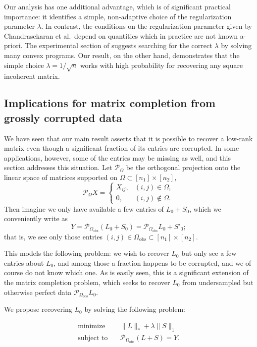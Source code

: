 Our analysis has one additional advantage, which is of significant practical importance: it identifies a simple, non-adaptive choice of the regularization parameter $\lambda$. In contrast, the conditions on the regularization parameter given by Chandrasekaran et al.~depend on quantities which in practice are not known a-priori. The experimental section of \cite{Venkat-09} suggests searching for the correct
$\lambda$ by solving many convex programs. Our result, on the other hand, demonstrates that the simple choice $\lambda = 1/\sqrt{n}$ works with high probability for recovering any square incoherent matrix.

\subsection{Implications for matrix completion from grossly corrupted data}
\label{sec:matrix-completion}

We have seen that our main result asserts that it is possible to recover a low-rank matrix even though a significant fraction of its entries are corrupted. In some applications, however, some of the entries may be missing as well, and this section addresses this situation. Let $\mathcal{P}_{\Omega}$ be the orthogonal projection onto the linear space of matrices supported on $\Omega \subset [n_1] \times [n_2]$,
\[
\mathcal{P}_{\Omega} X =

\begin{cases} X_{ij}, & (i,j) \in \Omega,\\ 0, & (i,j) \notin
  \Omega.
\end{cases}

\]
Then imagine we only have available a few entries of $L_0 + S_0$, which we conveniently write as
\[
Y = \mathcal{P}_{\Omega_{\text{obs}}}(L_0 + S_0) = \mathcal{P}_{\Omega_{\text{obs}}} L_0 + S'_0;
\]
that is, we see only those entries $(i,j) \in \Omega_{\text{obs}} \subset [n_1]
\times [n_2]$. 

This models the following problem: we wish to recover $L_0$ but only see a few entries about $L_0$, and among those a fraction happens to be corrupted, and we of course do not know which one. As is easily seen, this is a significant extension of the matrix completion problem, which seeks to recover $L_0$ from undersampled but otherwise perfect data $\mathcal{P}_{\Omega_{\text{obs}}} L_0$.

We propose recovering $L_0$ by solving the following problem:

\begin{equation}
  \label{eq:sdp2}
   \begin{array}{ll}
     \text{minimize}   & \quad \|L\|_* + \lambda \|S\|_1\\
     \text{subject to} & \quad \mathcal{P}_{\Omega_{\text{obs}}}(L + S) = Y. 
  \end{array}
\end{equation}

